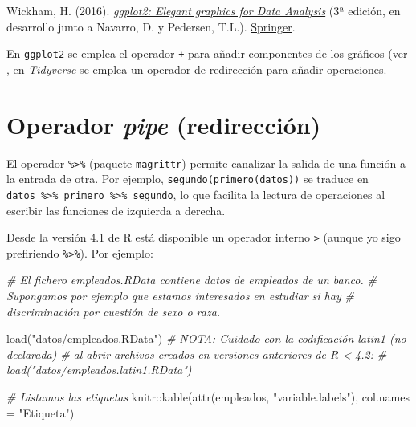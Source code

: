 \documentclass[
]{book}
\newenvironment{Shaded}{\begin{snugshade}}{\end{snugshade}}
\newcommand{\AttributeTok}[1]{\textcolor[rgb]{0.77,0.63,0.00}{#1}}
\newcommand{\CommentTok}[1]{\textcolor[rgb]{0.56,0.35,0.01}{\textit{#1}}}
\newcommand{\FunctionTok}[1]{\textcolor[rgb]{0.00,0.00,0.00}{#1}}
\newcommand{\NormalTok}[1]{#1}
\newcommand{\SpecialCharTok}[1]{\textcolor[rgb]{0.00,0.00,0.00}{#1}}
\newcommand{\StringTok}[1]{\textcolor[rgb]{0.31,0.60,0.02}{#1}}
\theoremstyle{break}
\theoremstyle{nonumberplain}
\begin{document}
Wickham, H. (2016). \emph{\href{https://ggplot2-book.org}{ggplot2: Elegant graphics for Data Analysis}} (3ª edición, en desarrollo junto a Navarro, D. y Pedersen, T.L.). \href{https://www.amazon.com/gp/product/331924275X}{Springer}.

En \href{https://ggplot2.tidyverse.org}{\texttt{ggplot2}} se emplea el operador \texttt{+} para añadir componentes de los gráficos (ver , en \emph{Tidyverse} se emplea un operador de redirección para añadir operaciones.

\hypertarget{pipe}{%
\section{\texorpdfstring{Operador \emph{pipe} (redirección)}{Operador pipe (redirección)}}\label{pipe}}

El operador \texttt{\%\textgreater{}\%} (paquete \href{https://magrittr.tidyverse.org}{\texttt{magrittr}}) permite canalizar la salida de una función a la entrada de otra.
Por ejemplo, \texttt{segundo(primero(datos))} se traduce en \texttt{datos\ \%\textgreater{}\%\ primero\ \%\textgreater{}\%\ segundo}, lo que facilita la lectura de operaciones al escribir las funciones de izquierda a derecha.

Desde la versión 4.1 de R está disponible un operador interno \texttt{\textbar{}\textgreater{}} (aunque yo sigo prefiriendo \texttt{\%\textgreater{}\%}).
Por ejemplo:

\begin{Shaded}
\begin{Highlighting}[]
\CommentTok{\# El fichero \textquotesingle{}empleados.RData\textquotesingle{} contiene datos de empleados de un banco.}
\CommentTok{\# Supongamos por ejemplo que estamos interesados en estudiar si hay}
\CommentTok{\# discriminación por cuestión de sexo o raza.}

\FunctionTok{load}\NormalTok{(}\StringTok{"datos/empleados.RData"}\NormalTok{)}
\CommentTok{\# NOTA: Cuidado con la codificación latin1 (no declarada) }
\CommentTok{\# al abrir archivos creados en versiones anteriores de R \textless{} 4.2: }
\CommentTok{\# load("datos/empleados.latin1.RData")}

\CommentTok{\# Listamos las etiquetas}
\NormalTok{knitr}\SpecialCharTok{::}\FunctionTok{kable}\NormalTok{(}\FunctionTok{attr}\NormalTok{(empleados, }\StringTok{"variable.labels"}\NormalTok{), }\AttributeTok{col.names =} \StringTok{"Etiqueta"}\NormalTok{)}
\end{Highlighting}
\end{Shaded}
\end{document}
